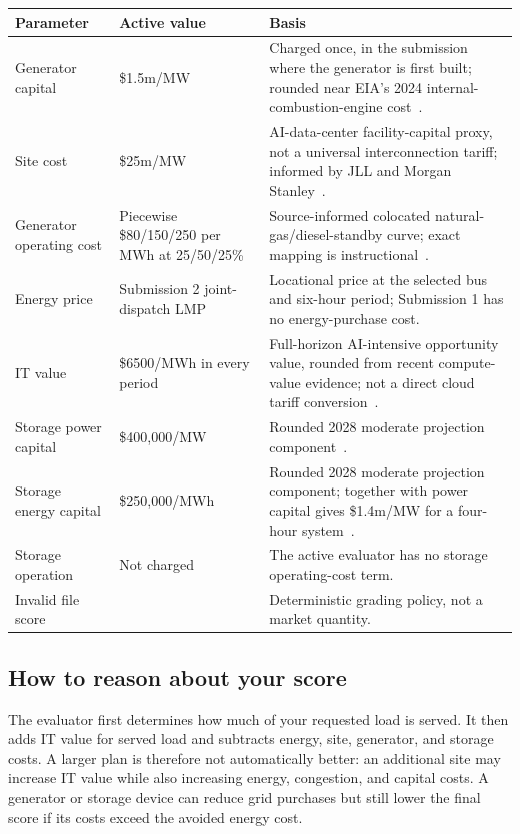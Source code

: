 \documentclass[12pt]{article}
\newcommand{\USD}{\$}
\begin{document}
\begin{center}
\small
\begin{tabularx}{0.98\textwidth}{>{\ttfamily\raggedright\arraybackslash}p{} >{\raggedright\arraybackslash}p{} X}
\toprule
Parameter & Active value & Basis\\
\midrule
Generator capital & \USD1.5m/MW & Charged once, in the submission where the generator is first built; rounded near EIA's 2024 internal-combustion-engine cost~\cite{eia2024generatorcosts}.\\
Site cost & \USD25m/MW & AI-data-center facility-capital proxy, not a universal interconnection tariff; informed by JLL and Morgan Stanley~\cite{jll2026dc,morganstanley2024dc}.\\
Generator operating cost & Piecewise \$80/150/250 per MWh at 25/50/25\% & Source-informed colocated natural-gas/diesel-standby curve; exact mapping is instructional~\cite{eia2026lcoe,eia2025heatrate}.\\
Energy price & Submission 2 joint-dispatch LMP & Locational price at the selected bus and six-hour period; Submission 1 has no energy-purchase cost.\\
IT value & \USD6500/MWh in every period & Full-horizon AI-intensive opportunity value, rounded from recent compute-value evidence; not a direct cloud tariff conversion~\cite{computeheat2026,iea2026ai}.\\
Storage power capital & \USD400,000/MW & Rounded 2028 moderate projection component~\cite{nrel2023bess}.\\
Storage energy capital & \USD250,000/MWh & Rounded 2028 moderate projection component; together with power capital gives \USD1.4m/MW for a four-hour system~\cite{nrel2023bess}.\\
Storage operation & Not charged & The active evaluator has no storage operating-cost term.\\
Invalid file score & 0 & Deterministic grading policy, not a market quantity.\\
\bottomrule
\end{tabularx}
\end{center}

\subsection{How to reason about your score}
The evaluator first determines how much of your requested load is served. It
then adds IT value for served load and subtracts energy, site, generator, and
storage costs. A larger plan is therefore not automatically better: an
additional site may increase IT value while also increasing energy,
congestion, and capital costs. A generator or storage device can reduce grid
purchases but still lower the final score if its costs exceed the avoided
energy cost.
\end{document}

